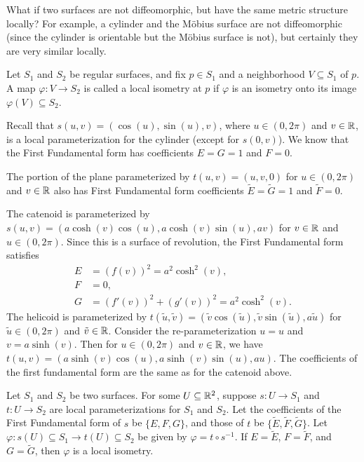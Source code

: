 \begin{rmk}
    What if two surfaces are not diffeomorphic, but have the same metric structure locally? For example, a cylinder and the M\"obius surface are not diffeomorphic (since the cylinder is orientable but the M\"obius surface is not), but certainly they are very similar locally.
\end{rmk}

\begin{defn}
    Let $S_1$ and $S_2$ be regular surfaces, and fix $p \in S_1$ and a neighborhood $V \subseteq S_1$ of $p$. A map $\varphi: V \to S_2$ is called a local isometry at $p$ if $\varphi$ is an isometry onto its image $\varphi(V) \subseteq S_2$.
\end{defn}

\begin{exmp}
    Recall that $s(u, v) = (\cos(u), \sin(u), v)$, where $u \in (0, 2\pi)$ and $v \in \mathbb{R}$, is a local parameterization for the cylinder (except for $s(0, v)$). We know that the First Fundamental form has coefficients $E = G = 1$ and $F = 0$.

    The portion of the plane parameterized by $t(u, v) = (u, v, 0)$ for $u \in (0, 2\pi)$ and $v \in \mathbb{R}$ also has First Fundamental form coefficients $\tilde{E} = \tilde{G} = 1$ and $\tilde{F} = 0$.
\end{exmp}

\begin{exmp}
    The catenoid is parameterized by $s(u, v) = (a\cosh(v)\cos(u), a\cosh(v)\sin(u), av)$ for $v \in \mathbb{R}$ and $u \in (0, 2\pi)$. Since this is a surface of revolution, the First Fundamental form satisfies
    \begin{align*}
        E &= (f(v))^2 = a^2\cosh^2(v), \\
        F &= 0, \\
        G &= (f'(v))^2 + (g'(v))^2 = a^2\cosh^2(v).
    \end{align*}
    The helicoid is parameterized by $t(\tilde{u}, \tilde{v}) = (\tilde{v}\cos(\tilde{u}), \tilde{v}\sin(\tilde{u}), a\tilde{u})$ for $\tilde{u} \in (0, 2\pi)$ and $\tilde{v} \in \mathbb{R}$. Consider the re-parameterization $u = u$ and $v = a\sinh(v)$. Then for $u \in (0, 2\pi)$ and $v \in \mathbb{R}$, we have $t(u, v) = (a\sinh(v)\cos(u), a\sinh(v)\sin(u), au)$. The coefficients of the first fundamental form are the same as for the catenoid above.
\end{exmp}

\begin{thm}\label{thm:local-isometry-coefficients}
    Let $S_1$ and $S_2$ be two surfaces. For some $U \subseteq \mathbb{R}^2$, suppose $s: U \to S_1$ and $t: U \to S_2$ are local parameterizations for $S_1$ and $S_2$. Let the coefficients of the First Fundamental form of $s$ be $\{E, F, G\}$, and those of $t$ be $\{\tilde{E}, \tilde{F}, \tilde{G}\}$. Let $\varphi: s(U) \subseteq S_1 \to t(U) \subseteq S_2$ be given by $\varphi = t \circ s^{-1}$. If $E = \tilde{E}$, $F = \tilde{F}$, and $G = \tilde{G}$, then $\varphi$ is a local isometry.
\end{thm}

